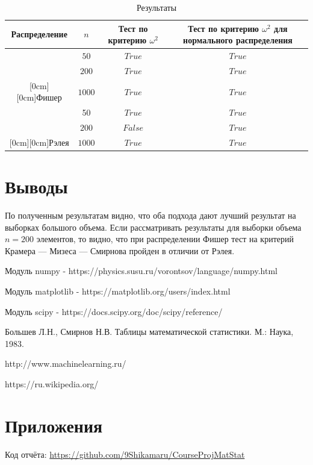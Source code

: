 \documentclass[a4]{article}
\begin{document}
\begin{table}[H]
\caption{Результаты}
\label{tab:my_label1}
\begin{center}
\vspace{5mm}
\begin{tabular}{|c|c|c|c|}
\hline
Распределение & $n$&Тест по критерию $\omega^2$ & Тест по критерию $\omega^2$ для нормального распределения \\
\hline
&$50$&	$True$&		$True$ \\
\cline{2-4}
&$200$&	$True$&		$True$ \\
\cline{2-4}
\raisebox{1.5ex}[0cm][0cm]{Фишер}&$1000$&	$True$&		$True$\\
\hline
&50&	$True$&		$True$ \\
\cline{2-4}
&$200$&	$False$&		$True$ \\
\cline{2-4}
\raisebox{1.5ex}[0cm][0cm]{Рэлея}&$1000$&	$True$&	$True$\\
\hline
\end{tabular}
\end{center}
\end{table}

\section{Выводы}

По полученным результатам видно, что оба подхода дают лучший результат на выборках большого объема. Если рассматривать результаты для выборки объема $n=200$ элементов, то видно, что при распределении Фишер тест на критерий Крамера — Мизеса — Смирнова пройден в отличии от Рэлея.

\begin{thebibliography}{}
      Модуль numpy  -  https://physics.susu.ru/vorontsov/language/numpy.html
    
    Модуль matplotlib - https://matplotlib.org/users/index.html
    
    Модуль scipy - https://docs.scipy.org/doc/scipy/reference/
    

Большев Л.Н., Смирнов Н.В. Таблицы математической статистики. М.: Наука, 1983.

http://www.machinelearning.ru/

https://ru.wikipedia.org/

\end{thebibliography}

\section{Приложения}


Код отчёта:\; \url{https://github.com/9Shikamaru/CourseProjMatStat}
\end{document}
